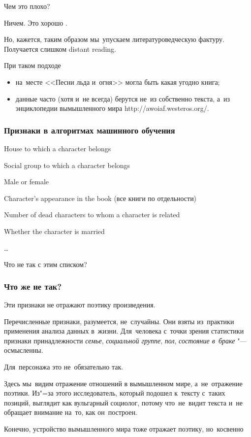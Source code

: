 \documentclass{beamer}
\begin{document}
\begin{frame}
\begin{block}{}
Чем это плохо? 
\end{block}
Ничем. Это хорошо {\Large \Smiley{}}.\par
Но, кажется, таким образом мы~упускаем литературоведческую фактуру. Получается слишком \alert{distant} reading.
\begin{block}{}
При таком подходе
\end{block}
\begin{itemize}
\item на~месте <<Песни льда и~огня>> могла быть какая угодно книга;
\item данные часто (хотя и~не всегда) берутся не~из собственно текста, а~из энциклопедии вымышленного мира http://awoiaf.westeros.org/.
\end{itemize}
\end{frame}

\begin{frame} %
\frametitle{Признаки в алгоритмах машинного обучения}
\begin{example}
House to which a character belongs \par
Social group to which a character belongs \par
Male or female \par
Character's appearance in the book (все книги по отдельности)\par
Number of dead characters to whom a character is related \par
Whether the character is married \par
\dots
\end{example}

\centering \LARGE{Что не так с этим списком?}

\end{frame}

\begin{frame}
\frametitle{Что же не так?}
\begin{block}{}
Эти признаки не отражают \alert{поэтику} произведения.
\end{block}
Перечисленные признаки, разумеется, не~случайны. Они взяты из~практики применения анализа данных в~жизни. Для~\alert{человека} с~точки зрения статистики признаки принадлежности \textit{семье}, \textit{социальной группе}, \textit{пол}, \textit{состояние в~браке} "--- осмысленны.\par
Для~\alert{персонажа} это не~обязательно так.\par
Здесь мы~видим отражение отношений \alert{в вымышленном мире}, а~не~отражение поэтики. Из"=за этого исследователь, который подошел к~тексту с~таких позиций, выглядит как вульгарный социолог, потому что~не~видит текста и~не обращает внимание на~то, как он~построен.
\parskip=12pt
\par
\small{Конечно, устройство вымышленного мира тоже отражает поэтику, но~косвенно}

\end{frame}
\end{document}
